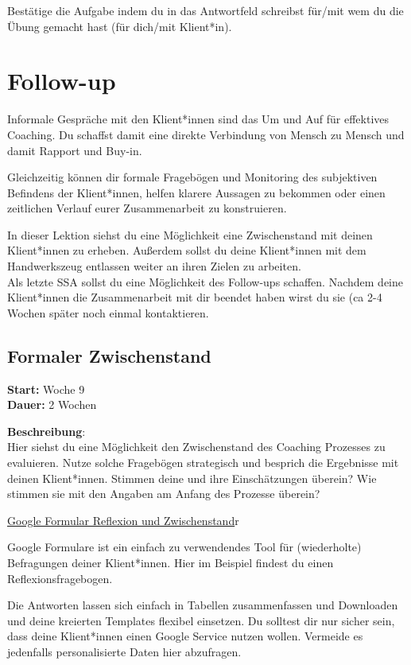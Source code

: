 \documentclass[
  letterpaper,
  DIV=11,
  numbers=noendperiod]{scrreprt}
\begin{document}
Bestätige die Aufgabe indem du in das Antwortfeld schreibst für/mit wem
du die Übung gemacht hast (für dich/mit Klient*in).

\section{Follow-up}\label{follow-up}

Informale Gespräche mit den Klient*innen sind das Um und Auf für
effektives Coaching. Du schaffst damit eine direkte Verbindung von
Mensch zu Mensch und damit Rapport und Buy-in.

Gleichzeitig können dir formale Fragebögen und Monitoring des
subjektiven Befindens der Klient*innen, helfen klarere Aussagen zu
bekommen oder einen zeitlichen Verlauf eurer Zusammenarbeit zu
konstruieren.

In dieser Lektion siehst du eine Möglichkeit eine Zwischenstand mit
deinen Klient*innen zu erheben. Außerdem sollst du deine Klient*innen
mit dem Handwerkszeug entlassen weiter an ihren Zielen zu arbeiten.\\
Als letzte SSA sollst du eine Möglichkeit des Follow-ups schaffen.
Nachdem deine Klient*innen die Zusammenarbeit mit dir beendet haben
wirst du sie (ca 2-4 Wochen später noch einmal kontaktieren.

\subsection{Formaler Zwischenstand}\label{formaler-zwischenstand}

\textbf{Start:} Woche 9\\
\textbf{Dauer:} 2 Wochen

\textbf{Beschreibung}:\\
Hier siehst du eine Möglichkeit den Zwischenstand des Coaching Prozesses
zu evaluieren. Nutze solche Fragebögen strategisch und besprich die
Ergebnisse mit deinen Klient*innen. Stimmen deine und ihre
Einschätzungen überein? Wie stimmen sie mit den Angaben am Anfang des
Prozesse überein?

\href{https://docs.google.com/forms/d/e/1FAIpQLSfOVfIAiZ3KLRkWxkahJSP6bdWIT8bwXSCUCIPXqb3FbM3OIw/viewform?usp=sharing}{Google
Formular Reflexion und Zwischenstand}r

Google Formulare ist ein einfach zu verwendendes Tool für (wiederholte)
Befragungen deiner Klient*innen. Hier im Beispiel findest du einen
Reflexionsfragebogen.

Die Antworten lassen sich einfach in Tabellen zusammenfassen und
Downloaden und deine kreierten Templates flexibel einsetzen. Du solltest
dir nur sicher sein, dass deine Klient*innen einen Google Service nutzen
wollen. Vermeide es jedenfalls personalisierte Daten hier abzufragen.
\end{document}
